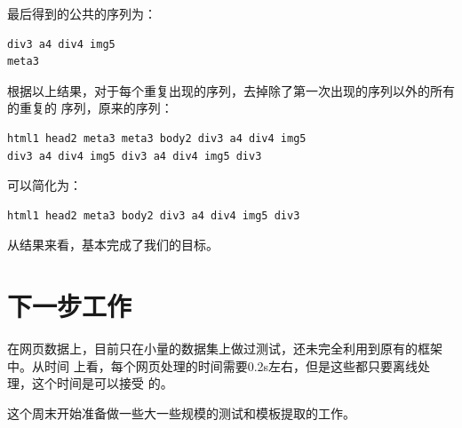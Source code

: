 \documentclass{article}
\begin{document}
最后得到的公共的序列为：
\begin{verbatim}
div3 a4 div4 img5
meta3
\end{verbatim}

根据以上结果，对于每个重复出现的序列，去掉除了第一次出现的序列以外的所有的重复的
序列，原来的序列：
\begin{verbatim}
html1 head2 meta3 meta3 body2 div3 a4 div4 img5
div3 a4 div4 img5 div3 a4 div4 img5 div3
\end{verbatim}

可以简化为：
\begin{verbatim}
html1 head2 meta3 body2 div3 a4 div4 img5 div3
\end{verbatim}

从结果来看，基本完成了我们的目标。
\section{下一步工作}
\label{sec-2}
在网页数据上，目前只在小量的数据集上做过测试，还未完全利用到原有的框架中。从时间
上看，每个网页处理的时间需要0.2s左右，但是这些都只要离线处理，这个时间是可以接受
的。

这个周末开始准备做一些大一些规模的测试和模板提取的工作。
\end{document}
